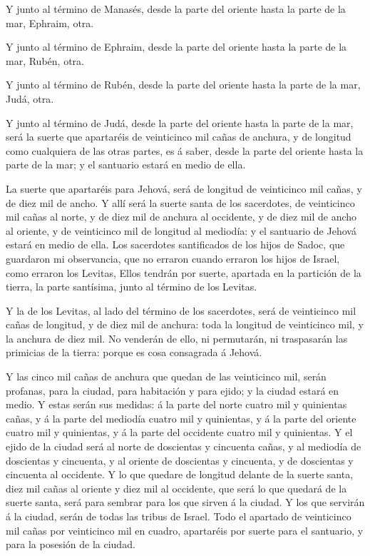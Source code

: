  Y junto al término de Manasés, desde la parte del oriente
hasta la parte de la mar, Ephraim, otra.

 Y junto al término de Ephraim, desde la parte del oriente
hasta la parte de la mar, Rubén, otra.

 Y junto al término de Rubén, desde la parte del oriente
hasta la parte de la mar, Judá, otra.

 Y junto al término de Judá, desde la parte del oriente
hasta la parte de la mar, será la suerte que apartaréis de veinticinco
mil cañas de anchura, y de longitud como cualquiera de las otras partes,
es á saber, desde la parte del oriente hasta la parte de la mar; y el
santuario estará en medio de ella.

 La suerte que apartaréis para Jehová, será de longitud de
veinticinco mil cañas, y de diez mil de ancho.  Y allí será
la suerte santa de los sacerdotes, de veinticinco mil cañas al norte, y
de diez mil de anchura al occidente, y de diez mil de ancho al oriente,
y de veinticinco mil de longitud al mediodía: y el santuario de Jehová
estará en medio de ella.  Los sacerdotes santificados de
los hijos de Sadoc, que guardaron mi observancia, que no erraron cuando
erraron los hijos de Israel, como erraron los Levitas, 
Ellos tendrán por suerte, apartada en la partición de la tierra, la
parte santísima, junto al término de los Levitas.

 Y la de los Levitas, al lado del término de los
sacerdotes, será de veinticinco mil cañas de longitud, y de diez mil de
anchura: toda la longitud de veinticinco mil, y la anchura de diez mil.
 No venderán de ello, ni permutarán, ni traspasarán las
primicias de la tierra: porque es cosa consagrada á Jehová.

 Y las cinco mil cañas de anchura que quedan de las
veinticinco mil, serán profanas, para la ciudad, para habitación y para
ejido; y la ciudad estará en medio.  Y estas serán sus
medidas: á la parte del norte cuatro mil y quinientas cañas, y á la
parte del mediodía cuatro mil y quinientas, y á la parte del oriente
cuatro mil y quinientas, y á la parte del occidente cuatro mil y
quinientas.  Y el ejido de la ciudad será al norte de
doscientas y cincuenta cañas, y al mediodía de doscientas y cincuenta, y
al oriente de doscientas y cincuenta, y de doscientas y cincuenta al
occidente.  Y lo que quedare de longitud delante de la
suerte santa, diez mil cañas al oriente y diez mil al occidente, que
será lo que quedará de la suerte santa, será para sembrar para los que
sirven á la ciudad.  Y los que servirán á la ciudad, serán
de todas las tribus de Israel.  Todo el apartado de
veinticinco mil cañas por veinticinco mil en cuadro, apartaréis por
suerte para el santuario, y para la posesión de la ciudad.


